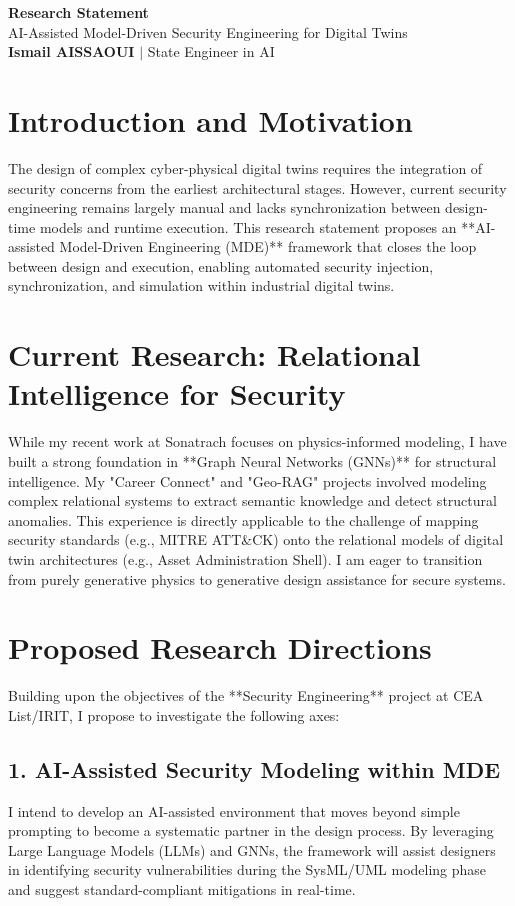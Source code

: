\documentclass[a4paper,11pt]{article}
\begin{document}
\begin{center}
    {\LARGE\bfseries\color{titleblue} Research Statement}\\[6pt]
    {\large AI-Assisted Model-Driven Security Engineering for Digital Twins}\\[4pt]
    \textbf{Ismail AISSAOUI} $|$ State Engineer in AI
\end{center}

\bigskip

\section{Introduction and Motivation}
The design of complex cyber-physical digital twins requires the integration of security concerns from the earliest architectural stages. However, current security engineering remains largely manual and lacks synchronization between design-time models and runtime execution. This research statement proposes an **AI-assisted Model-Driven Engineering (MDE)** framework that closes the loop between design and execution, enabling automated security injection, synchronization, and simulation within industrial digital twins.

\section{Current Research: Relational Intelligence for Security}
While my recent work at Sonatrach focuses on physics-informed modeling, I have built a strong foundation in **Graph Neural Networks (GNNs)** for structural intelligence. My "Career Connect" and "Geo-RAG" projects involved modeling complex relational systems to extract semantic knowledge and detect structural anomalies. This experience is directly applicable to the challenge of mapping security standards (e.g., MITRE ATT\&CK) onto the relational models of digital twin architectures (e.g., Asset Administration Shell). I am eager to transition from purely generative physics to generative design assistance for secure systems.

\section{Proposed Research Directions}
Building upon the objectives of the **Security Engineering** project at CEA List/IRIT, I propose to investigate the following axes:

\subsection{1. AI-Assisted Security Modeling within MDE}
I intend to develop an AI-assisted environment that moves beyond simple prompting to become a systematic partner in the design process. By leveraging Large Language Models (LLMs) and GNNs, the framework will assist designers in identifying security vulnerabilities during the SysML/UML modeling phase and suggest standard-compliant mitigations in real-time.
\end{document}
